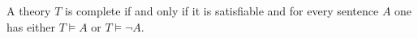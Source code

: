 

\setcounter{section}{3}
\setcounter{subsection}{1}
\setcounter{dfn}{12}

\begin{lem}
A theory $T$ is complete if and only if it is satisfiable and for every sentence $A$ one has either $T \vDash A$ or $T \vDash \neg A$.
\end{lem}

